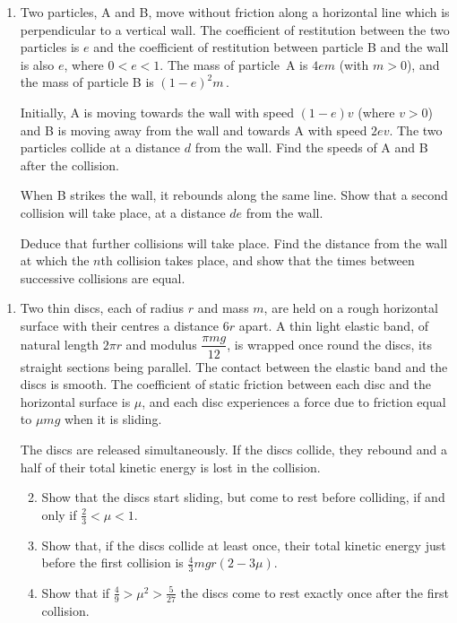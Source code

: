 \documentclass[a4, 11pt]{report}
\newlength{\qspace}
\newcounter{qnumber}
\newenvironment{question}%
 {\vspace{\qspace}
  \begin{enumerate}[\bfseries 1\quad][10]%
    \setcounter{enumi}{\value{qnumber}}%
    \item%
 }
{
  \end{enumerate}
  \filbreak
  \stepcounter{qnumber}
 }
\newenvironment{questionparts}[1][1]%
 {
  \begin{enumerate}[\bfseries (i)]%
    \setcounter{enumii}{#1}
    \addtocounter{enumii}{-1}
    \setlength{\itemsep}{5mm}
    \setlength{\parskip}{8pt}
 }
 {
  \end{enumerate}
 }
\begin{document}
	
\begin{question}
Two particles, A and B, 
move without friction along a horizontal line which is 
perpendicular to a vertical wall. 
The coefficient of restitution between the two particles is $e$ 
and the coefficient of restitution between particle B 
and the wall is also $e$, where $0<e<1$. 
The mass of particle~A is $4em$ (with $m>0$), 
and the mass of particle B is $(1-e)^2m$\,. 
 
Initially, A is moving towards the wall with speed $(1-e)v$ 
(where $v>0$) and B is moving away from the wall and towards A 
with speed $2ev$. The two particles collide at a 
distance $d$ from the wall. Find the speeds of A and B after the collision. 
 
When B strikes the wall, it rebounds along the same line. 
Show that a second collision will take place, 
at a distance $de$ from the wall. 
 
Deduce that further collisions will take place. Find 
the distance from the wall at which the $n$th collision takes place,
and show that the times between successive collisions are equal. 
	\end{question}
	
\begin{question}	
Two thin discs, each of radius $r$ and mass $m$, are held on a rough
horizontal surface with their centres a distance $6r$ apart. A thin light
 elastic band, of natural length $2\pi r$ and modulus $\dfrac{\pi mg}{12}$, 
is wrapped once round
the discs, its straight sections being parallel. The contact between the
elastic band and the discs is smooth. The coefficient of static 
friction between
each disc and the horizontal surface is $\mu$, and each disc
experiences a force due to friction equal to $\mu mg$ when it is
sliding.

The discs are released simultaneously.  If the discs collide, 
they rebound and  a half of their total
kinetic energy is lost in the collision. 

\begin{questionparts}
\item Show that the discs start sliding, but
come to rest before colliding, if and only if \mbox{$\frac23 <\mu <1$}.

\item Show that, if the discs collide at least once, 
their total kinetic energy
just before the first collision is $\frac43 mgr(2-3\mu)$.
\item
Show that if $\frac 4 9 > \mu^2 >\frac{5}{27}$ the discs come to
rest exactly once after the first collision.
\end{questionparts}
\end{question}
\end{document}
